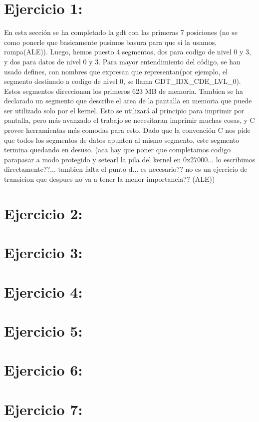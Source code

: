\documentclass[a4paper]{article}
\begin{document}
\clearpage

\section{Ejercicio 1:}
En esta sección se ha completado la gdt con las primeras 7 posiciones 
(no se como ponerle que basicamente pusimos basura para que si la usamos, rompa(ALE)). Luego, hemos puesto 4 segmentos, dos para codigo de nivel 0 y 3, y dos para datos de nivel 0 y 3. Para mayor entendimiento del código, se han usado defines, con nombres que expresan que representan(por ejemplo, el segmento destinado a codigo de nivel 0, se llama GDT_IDX_CDE_LVL_0). Estos segmentos direccionan los primeros 623 MB de memoria. Tambien se ha declarado un segmento que describe el area de la pantalla en memoria que puede ser utilizado solo por el kernel. Esto se utilizará al principio para imprimir por pantalla, pero más avanzado el trabajo se necesitaran imprimir muchas cosas, y C provee herramientas más comodas para esto. Dado que la convención C nos pide que todos los segmentos de datos apunten al mismo segmento, este segmento termina quedando en desuso. (aca hay que poner que completamos codigo parapasar a modo protegido y setearl la pila del kernel en 0x27000... lo escribimos directamente??... tambien falta el punto d... es necesario?? no es un ejercicio de transicion que despues no va a tener la menor importancia?? (ALE))

%

\clearpage

\section{Ejercicio 2:} 
%

\clearpage

\section{Ejercicio 3:}
%

\clearpage

\section{Ejercicio 4:}
%

\clearpage

\section{Ejercicio 5:}
%

\clearpage

\section{Ejercicio 6:}


\clearpage

\section{Ejercicio 7:}
\end{document}
